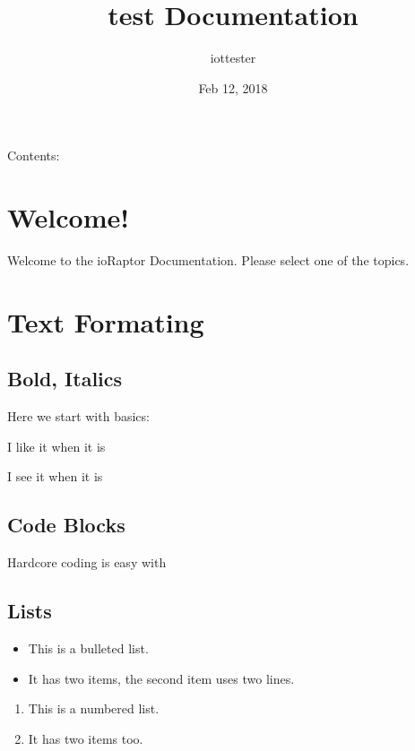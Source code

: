 \documentclass[letterpaper,10pt,english]{sphinxmanual}
\title{test Documentation}
\date{Feb 12, 2018}
\author{iottester}
\begin{document}
\maketitle
\sphinxtableofcontents
{}\label{\detokenize{index::doc}}


Contents:


\chapter{Welcome!}
\label{\detokenize{intro:welcome}}\label{\detokenize{intro::doc}}\label{\detokenize{intro:welcome-to-ioraptor-documentation}}
Welcome to the ioRaptor Documentation. Please select one of the topics.


\chapter{Text Formating}
\label{\detokenize{textformating::doc}}\label{\detokenize{textformating:text-formating}}

\section{Bold, Italics}
\label{\detokenize{textformating:bold-italics}}
Here we start with basics:

I like it when it is 

I see it when it is 


\section{Code Blocks}
\label{\detokenize{textformating:code-blocks}}
Hardcore coding is easy with 


\section{Lists}
\label{\detokenize{textformating:lists}}\begin{itemize}
\item {} 
This is a bulleted list.

\item {} 
It has two items, the second item uses two lines.

\end{itemize}
\begin{enumerate}
\item {} 
This is a numbered list.

\item {} 
It has two items too.

\end{enumerate}
\end{document}
